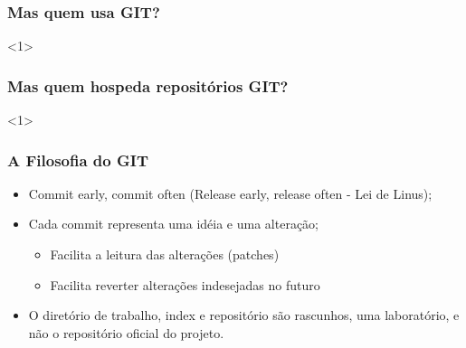 \begin{frame}
\frametitle{Mas quem usa GIT?}

<1>

\end{frame}

\begin{frame}
\frametitle{Mas quem hospeda repositórios GIT?}

<1>

\end{frame}

\begin{frame}
\frametitle{A Filosofia do GIT}
\begin{itemize}
\item Commit early, commit often (Release early, release often - Lei de Linus);
\item Cada commit representa uma idéia e uma alteração;
\begin{itemize}
\item Facilita a leitura das alterações (patches)
\item Facilita reverter alterações indesejadas no futuro
\end{itemize}
\item O diretório de trabalho, index e repositório são rascunhos, uma laboratório, e não o repositório oficial do projeto.
\end{itemize}
\end{frame}

